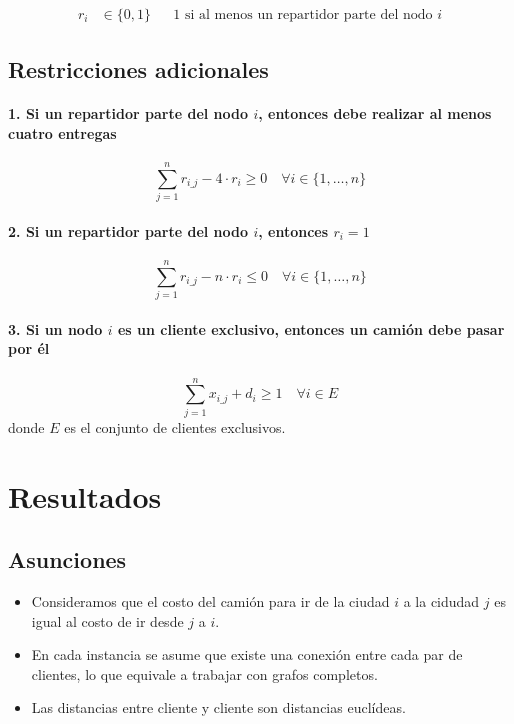 \documentclass{article}
\begin{document}
\begin{align*}
    r_{i} &\in \{0,1\} && \text{1 si al menos un repartidor parte del nodo } i 
\end{align*}

\subsection*{Restricciones adicionales}

\paragraph{1. Si un repartidor parte del nodo $i$, entonces debe realizar al menos cuatro entregas}
\[
\sum_{j=1}^{n} r_{i\_j} - 4 \cdot r_{i} \geq 0 \quad \forall i \in \{1, \dots, n\}
\]

\paragraph{2. Si un repartidor parte del nodo $i$, entonces $r_i = 1$}
\[
\sum_{j=1}^{n} r_{i\_j} - n \cdot r_{i} \leq 0 \quad \forall i \in \{1, \dots, n\}
\]

\paragraph{3. Si un nodo $i$ es un cliente exclusivo, entonces un camión debe pasar por él}
\[
\sum_{j=1}^{n} x_{i\_j} + d_{i} \geq 1 \quad \forall i \in E
\]
donde $E$ es el conjunto de clientes exclusivos.


\section{Resultados}

\subsection{Asunciones}

\begin{itemize}
    \item Consideramos que el costo del camión para ir de la ciudad $i$ a la cidudad $j$ es igual al costo de ir desde $j$ a $i$.
    \item En cada instancia se asume que existe una conexión entre cada par de clientes, lo que equivale a trabajar con grafos completos.
    \item Las distancias entre cliente y cliente son distancias euclídeas.
\end{itemize}
\end{document}

